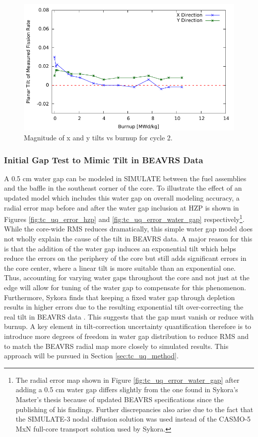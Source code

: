 \documentclass{article}
\begin{document}
\begin{figure}[!htb]
\centering
\includegraphics[width = 4.5 in]{figures/tilts_cyc2.pdf}
\caption{Magnitude of x and y tilts vs burnup for cycle 2.}
\label{fig:tilts_cyc2}
\end{figure}

\subsubsection{Initial Gap Test to Mimic Tilt in BEAVRS Data}\label{sec:init_gap_test}

A 0.5 cm water gap can be modeled in SIMULATE between the fuel assemblies and the baffle in the southeast corner of the core. To illustrate the effect of an updated model which includes this water gap on overall modeling accuracy, a radial error map before and after the water gap inclusion at HZP is shown in Figures \ref{fig:tc_uq_error_hzp} and \ref{fig:tc_uq_error_water_gap} respectively\footnote{The radial error map shown in Figure \ref{fig:tc_uq_error_water_gap} after adding a 0.5 cm water gap differs slightly from the one found in Sykora's Master's thesis because of updated BEAVRS specifications since the publishing of his findings. Further discrepancies also arise due to the fact that the SIMULATE-3 nodal diffusion solution was used instead of the CASMO-5 MxN full-core transport solution used by Sykora.}. While the core-wide RMS reduces dramatically, this simple water gap model does not wholly explain the cause of the tilt in BEAVRS data. A major reason for this is that the addition of the water gap induces an exponential tilt which helps reduce the errors on the periphery of the core but still adds significant errors in the core center, where a linear tilt is more suitable than an exponential one. Thus, accounting for varying water gaps throughout the core and not just at the edge will allow for tuning of the water gap to compensate for this phenomenon. Furthermore, Sykora finds that keeping a fixed water gap through depletion results in higher errors due to the resulting exponential tilt over-correcting the real tilt in BEAVRS data \cite{sykora_ms}. This suggests that the gap must vanish or reduce with burnup. A key element in tilt-correction uncertainty quantification therefore is to introduce more degrees of freedom in water gap distribution to reduce RMS and to match the BEAVRS radial map more closely to simulated results. This approach will be pursued in Section \ref{sec:tc_uq_method}. 
\end{document}
